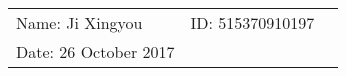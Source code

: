 \documentclass{article}
\begin{document}
\begin{spacing}{1.5}

\vspace*{0.25cm}

\hrulefill

\thispagestyle{empty}

\begin{center}
\begin{large}
\end{large}

\hrulefill

\vspace*{5cm}
\begin{Large}
\end{Large}

\vspace{2em}

\begin{large}
\end{large}
\end{center}


\vfill

\begin{table}[h!]
\flushleft
\begin{tabular}{lll}
Name: Ji Xingyou \hspace*{2em}&
ID: 515370910197\hspace*{2em}
\\

Date: 26 October 2017

\end{tabular}
\end{table}

\hfill
\newpage
\tableofcontents
\newpage

\end{spacing}
\end{document}
